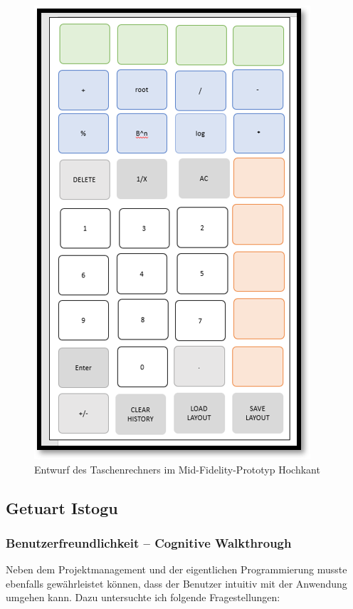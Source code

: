 \begin{figure}[!h]
	\includegraphics[scale=1]{img/erster-entwurf-mid-fidelty-prototyp-hoch}
	\caption[Entwurf des Taschenrechners im Mid-Fidelity-Prototyp Hochkant]{Entwurf des Taschenrechners im Mid-Fidelity-Prototyp Hochkant\footnotemark}
\end{figure}

\FloatBarrier

\subsection{Getuart Istogu}

\subsubsection{Benutzerfreundlichkeit – Cognitive Walkthrough}
Neben dem Projektmanagement und der eigentlichen Programmierung musste ebenfalls gewährleistet können, dass der Benutzer intuitiv mit der Anwendung umgehen kann. Dazu untersuchte ich folgende Fragestellungen:

